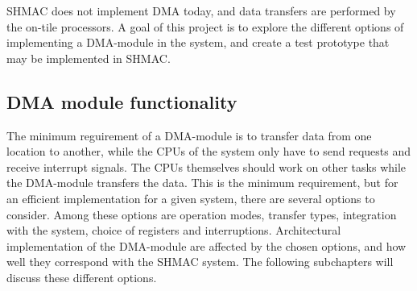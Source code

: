 SHMAC does not implement DMA today, and data transfers are performed by the on-tile processors. 
A goal of this project is to explore the different options of implementing a DMA-module in the system, and create a test prototype that may be implemented in SHMAC.

\subsection{DMA module functionality}
The minimum reguirement of a DMA-module is to transfer data from one location to another, while the CPUs of the system only have to send requests and receive interrupt signals.
The CPUs themselves should work on other tasks while the DMA-module transfers the data.
This is the minimum requirement, but for an efficient implementation for a given system, there are several options to consider.
Among these options are operation modes, transfer types, integration with the system, choice of registers and interruptions.
Architectural implementation of the DMA-module are affected by the chosen options, and how well they correspond with the SHMAC system.
The following subchapters will discuss these different options. 

